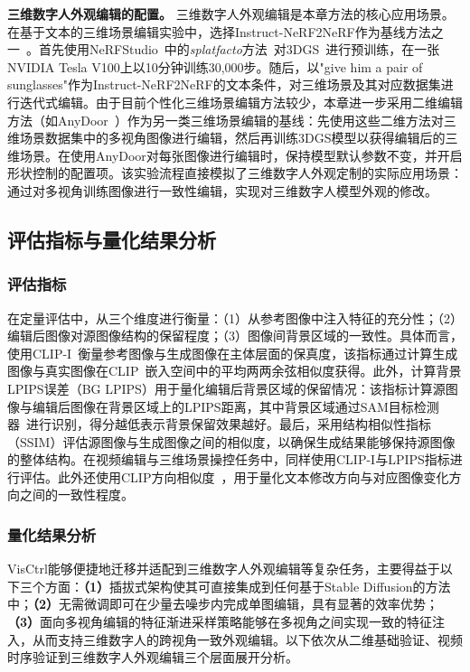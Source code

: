 \textbf{三维数字人外观编辑的配置。}
三维数字人外观编辑是本章方法的核心应用场景。在基于文本的三维场景编辑实验中，选择Instruct-NeRF2NeRF作为基线方法之一~\citep{instructnerf2023}。首先使用NeRFStudio~\citep{tancik2023nerfstudio}中的\emph{splatfacto}方法~\citep{igs2gs}对3DGS~\cite{kerbl3Dgaussians}进行预训练，在一张NVIDIA Tesla V100上以10分钟训练30,000步。随后，以"give him a pair of sunglasses"作为Instruct-NeRF2NeRF的文本条件，对三维场景及其对应数据集进行迭代式编辑。由于目前个性化三维场景编辑方法较少，本章进一步采用二维编辑方法（如AnyDoor~\citep{chen2023anydoor}）作为另一类三维场景编辑的基线：先使用这些二维方法对三维场景数据集中的多视角图像进行编辑，然后再训练3DGS模型以获得编辑后的三维场景。在使用AnyDoor对每张图像进行编辑时，保持模型默认参数不变，并开启形状控制的配置项。该实验流程直接模拟了三维数字人外观定制的实际应用场景：通过对多视角训练图像进行一致性编辑，实现对三维数字人模型外观的修改。


\subsection{评估指标与量化结果分析}
\subsubsection{评估指标}
在定量评估中，从三个维度进行衡量：（1）从参考图像中注入特征的充分性；（2）编辑后图像对源图像结构的保留程度；（3）图像间背景区域的一致性。具体而言，使用CLIP-I~\cite{ruiz2023dreambooth}衡量参考图像与生成图像在主体层面的保真度，该指标通过计算生成图像与真实图像在CLIP~\cite{radford2021learning}嵌入空间中的平均两两余弦相似度获得。此外，计算背景LPIPS误差（BG LPIPS）用于量化编辑后背景区域的保留情况：该指标计算源图像与编辑后图像在背景区域上的LPIPS距离，其中背景区域通过SAM目标检测器~\cite{kirillov2023segany}进行识别，得分越低表示背景保留效果越好。最后，采用结构相似性指标（SSIM）评估源图像与生成图像之间的相似度，以确保生成结果能够保持源图像的整体结构。在视频编辑与三维场景操控任务中，同样使用CLIP-I与LPIPS指标进行评估。此外还使用CLIP方向相似度~\cite{gal2021stylegannada}，用于量化文本修改方向与对应图像变化方向之间的一致性程度。

\subsubsection{量化结果分析}

VisCtrl能够便捷地迁移并适配到三维数字人外观编辑等复杂任务，主要得益于以下三个方面：\textbf{（1）}插拔式架构使其可直接集成到任何基于Stable Diffusion的方法中；\textbf{（2）}无需微调即可在少量去噪步内完成单图编辑，具有显著的效率优势；\textbf{（3）}面向多视角编辑的特征渐进采样策略能够在多视角之间实现一致的特征注入，从而支持三维数字人的跨视角一致外观编辑。以下依次从二维基础验证、视频时序验证到三维数字人外观编辑三个层面展开分析。

